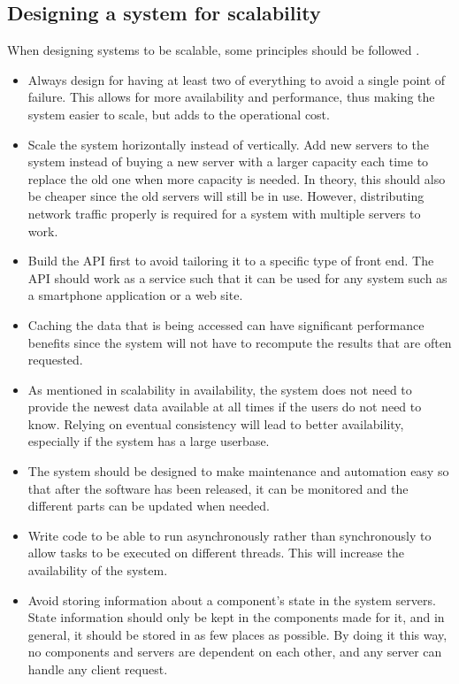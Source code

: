 

\subsection{Designing a system for scalability}
When designing systems to be scalable, some principles should be followed \cite{ScalabilityDesignPrinciples}.
\begin{itemize}
    \item Always design for having at least two of everything to avoid a single point of failure. 
    This allows for more availability and performance, thus making the system easier to scale, but adds to the operational cost.
    \item Scale the system horizontally instead of vertically.
    Add new servers to the system instead of buying a new server with a larger capacity each time to replace the old one when more capacity is needed. 
    In theory, this should also be cheaper since the old servers will still be in use. 
    However, distributing network traffic properly is required for a system with multiple servers to work.
    \item Build the API first to avoid tailoring it to a specific type of front end. 
    The API should work as a service such that it can be used for any system such as a smartphone application or a web site. 
    \item Caching the data that is being accessed can have significant performance benefits since the system will not have to recompute the results that are often requested. 
    \item As mentioned in scalability in availability, the system does not need to provide the newest data available at all times if the users do not need to know. 
    Relying on eventual consistency will lead to better availability, especially if the system has a large userbase.
    \item The system should be designed to make maintenance and automation easy so that after the software has been released, it can be monitored and the different parts can be updated when needed.
    \item Write code to be able to run asynchronously rather than synchronously to allow tasks to be executed on different threads. This will increase the availability of the system.
    \item Avoid storing information about a component's state in the system servers. 
    State information should only be kept in the components made for it, and in general, it should be stored in as few places as possible. 
    By doing it this way, no components and servers are dependent on each other, and any server can handle any client request. 
\end{itemize}
